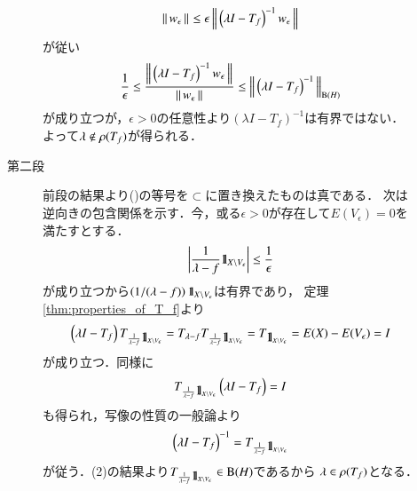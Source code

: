 \begin{prf}
\begin{description}
\begin{description}
						\begin{align}
							\left\|\, w_{\epsilon}\, \right\|_{} \leq \epsilon \left\|\, \left( \lambda I - T_f \right)^{-1}w_\epsilon\, \right\|_{}
						\end{align}
						が従い
						\begin{align}
							\frac{1}{\epsilon} \leq \frac{\left\|\, \left( \lambda I - T_f \right)^{-1}w_\epsilon\, \right\|_{}}{\left\|\, w_{\epsilon}\, \right\|_{}}
							\leq \left\|\, \left( \lambda I - T_f \right)^{-1}\, \right\|_{\mathrm{B}(H) }
						\end{align}
						が成り立つが，$\epsilon > 0$の任意性より$\left( \lambda I - T_f \right)^{-1}$は有界ではない．
						よって$\lambda \notin \mathfrak{\rho} (T_f) $が得られる．
						
					\item[第二段]
						前段の結果より()の等号を$\subset$に置き換えたものは真である．
						次は逆向きの包含関係を示す．今，或る$\epsilon > 0$が存在して$E(V_\epsilon) = 0$を満たすとする．
						\begin{align}
							\left| \frac{1}{\lambda - f} \mbox{1}\hspace{-0.25em}\mbox{l}_{X \backslash V_\epsilon} \right| \leq \frac{1}{\epsilon}
						\end{align}
						が成り立つから$\left( 1/(\lambda - f) \right) \mbox{1}\hspace{-0.25em}\mbox{l}_{X \backslash V_\epsilon}$は有界であり，
						定理\ref{thm:properties_of_T_f}より
						\begin{align}
							\left( \lambda I - T_f \right) T_{\frac{1}{\lambda - f} \mbox{1}\hspace{-0.25em}\mbox{l}_{X \backslash V_\epsilon}}
							= T_{\lambda - f} T_{\frac{1}{\lambda - f} \mbox{1}\hspace{-0.25em}\mbox{l}_{X \backslash V_\epsilon}}
							= T_{\mbox{1}\hspace{-0.25em}\mbox{l}_{X \backslash V_\epsilon}}
							= E(X) - E(V_\epsilon)
							= I
						\end{align}
						が成り立つ．同様に
						\begin{align}
							T_{\frac{1}{\lambda - f} \mbox{1}\hspace{-0.25em}\mbox{l}_{X \backslash V_\epsilon}} \left( \lambda I - T_f \right) = I
						\end{align}
						も得られ，写像の性質の一般論より
						\begin{align}
							\left( \lambda I - T_f \right)^{-1} = T_{\frac{1}{\lambda - f} \mbox{1}\hspace{-0.25em}\mbox{l}_{X \backslash V_\epsilon}}
						\end{align}
						が従う．(2)の結果より$T_{\frac{1}{\lambda - f} \mbox{1}\hspace{-0.25em}\mbox{l}_{X \backslash V_\epsilon}} \in \mathrm{B}(H) $であるから
						$\lambda \in \mathfrak{\rho} (T_f) $となる．
						\QED
				\end{description}
		\end{description}
	\end{prf}
	
